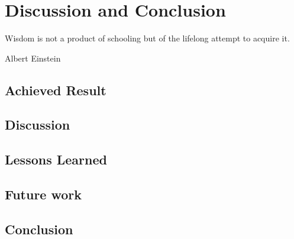 \chapter{Discussion and Conclusion}
\epigraph{Wisdom is not a product of schooling but of the lifelong attempt to acquire it.}{Albert Einstein}
\section{Achieved Result}

\section{Discussion}

\section{Lessons Learned}

\section{Future work}

\section{Conclusion}
